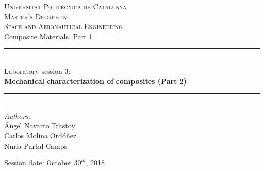 
\begin{titlepage}

\newcommand{\HRule}{\rule{\linewidth}{0.5mm}} %

\center %


\textsc{\LARGE Universitat Politècnica de Catalunya}\\[0.5cm]
\textsc{\Large Master's Degree in\\ Space and Aeronautical Engineering}\\[1.8cm]

\Large Composite Materials. Part 1\\





\HRule \\[0.2cm]
\Large Laboratory session 3:\\[0.5cm]
{ \Large \bfseries
Mechanical characterization of composites (Part 2)\\[0cm]
}
\HRule \\[3.5cm]


\emph{Authors:}\\
{ \normalsize
Ángel Navarro Trastoy\\
Carlos Molina Ordóñez\\
Nuria Partal Camps\\[1cm]
}

{\normalsize Session date: October $30^{th}$, 2018}\\[2cm] %



\vfill %

\end{titlepage}
